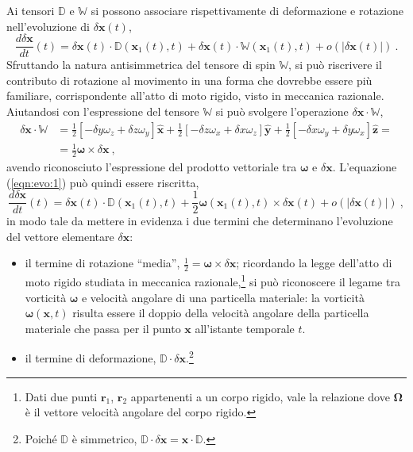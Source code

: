 Ai tensori $\mathbb{D}$ e $\mathbb{W}$ si possono associare rispettivamente di deformazione e rotazione nell'evoluzione di $\delta \bm{x}(t)$,
\begin{equation}\label{eqn:evo:1}
    \frac{d \delta \bm{x}}{d t}(t) = \delta \bm{x}(t) \cdot \mathbb{D}(\bm{x}_1(t),t) +
                                     \delta \bm{x}(t) \cdot \mathbb{W}(\bm{x}_1(t),t) + o(|\delta\bm{x}(t)|) \ .
\end{equation}
Sfruttando la natura antisimmetrica del tensore di spin $\mathbb{W}$, si può riscrivere il contributo di rotazione al movimento in una forma che dovrebbe essere più familiare, corrispondente all'atto di moto rigido, visto in meccanica razionale. Aiutandosi con l'espressione del tensore $\mathbb{W}$ si può svolgere l'operazione $\delta\bm{x} \cdot \mathbb{W}$,
\begin{equation}
\begin{aligned}
 \delta\bm{x} \cdot \mathbb{W} & = \frac{1}{2}\left[ - \delta y \omega_z + \delta z \omega_y \right] \bm{\hat{x}} +
                                   \frac{1}{2}\left[ - \delta z \omega_x + \delta x \omega_z \right] \bm{\hat{y}} +
                                   \frac{1}{2}\left[ - \delta x \omega_y + \delta y \omega_x \right] \bm{\hat{z}} = \\
  & = \frac{1}{2} \bm{\omega} \times \delta \bm{x} \ ,
\end{aligned}
\end{equation}
avendo riconosciuto l'espressione del prodotto vettoriale tra $\bm{\omega}$ e $\delta \bm{x}$. L'equazione (\ref{eqn:evo:1}) può quindi essere riscritta,
\begin{equation}
    \frac{d \delta \bm{x}}{d t}(t) = \delta \bm{x}(t) \cdot \mathbb{D}(\bm{x}_1(t),t) + 
    \frac{1}{2} \bm{\omega}(\bm{x}_1(t),t) \times \delta \bm{x}(t) + o(|\delta\bm{x}(t)|) \ ,
\end{equation}
in modo tale da mettere in evidenza i due termini che determinano l'evoluzione del vettore elementare $\delta \bm{x}$:
\begin{itemize}
 \item il termine di rotazione ``media'', $\frac{1}{2} = \bm{\omega} \times \delta \bm{x}$; ricordando la legge dell'atto di moto rigido studiata in meccanica razionale,\footnote{
  Dati due punti $\bm{r}_1$, $\bm{r}_2$ appartenenti a un corpo rigido, vale la relazione
  dove $\bm{\Omega}$ è il vettore velocità angolare del corpo rigido.
 }
 si può riconoscere il legame tra vorticità $\bm{\omega}$ e velocità angolare di una particella materiale: la vorticità $\bm{\omega}(\bm{x},t)$ risulta essere il doppio della velocità angolare della particella materiale che passa per il punto $\bm{x}$ all'istante temporale $t$.
 \item il termine di deformazione, $\mathbb{D} \cdot \delta \bm{x}$.\footnote{
 Poiché $\mathbb{D}$ è simmetrico, $\mathbb{D} \cdot \delta \bm{x} = \bm{x} \cdot \mathbb{D}$.}
\end{itemize}
